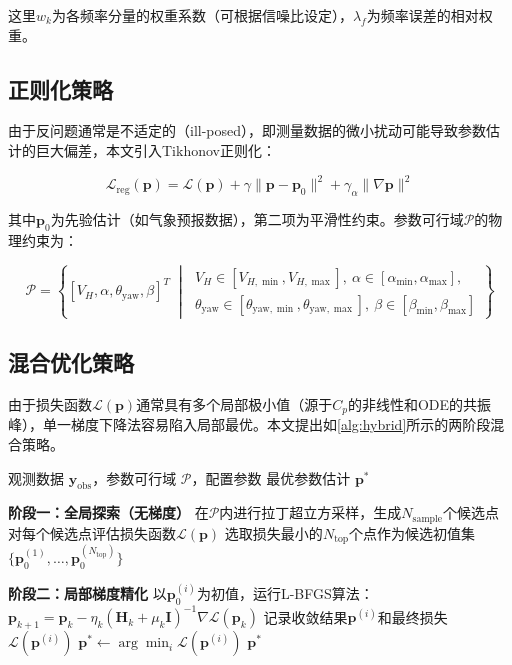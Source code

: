 \documentclass[withoutpreface,bwprint]{cumcmthesis}
\begin{document}
这里$w_k$为各频率分量的权重系数（可根据信噪比设定），$\lambda_f$为频率误差的相对权重。

\subsection{正则化策略}

由于反问题通常是不适定的（ill-posed），即测量数据的微小扰动可能导致参数估计的巨大偏差，本文引入Tikhonov正则化：

\begin{equation}
\mathcal{L}_{\mathrm{reg}}(\mathbf{p}) = \mathcal{L}(\mathbf{p}) + \gamma\|\mathbf{p}-\mathbf{p}_0\|^2 + \gamma_\alpha\|\nabla\mathbf{p}\|^2
\label{eq:reg}
\end{equation}

其中$\mathbf{p}_0$为先验估计（如气象预报数据），第二项为平滑性约束。参数可行域$\mathcal{P}$的物理约束为：

\begin{equation}
\mathcal{P} = \left\{ [V_H,\alpha,\theta_{\mathrm{yaw}},\beta]^T \;\middle|\; 
\begin{array}{l}
V_H \in [V_{H,\min}, V_{H,\max}],\ 
\alpha \in [\alpha_{\min}, \alpha_{\max}], \\
\theta_{\mathrm{yaw}} \in [\theta_{\mathrm{yaw},\min}, \theta_{\mathrm{yaw},\max}],\ 
\beta \in [\beta_{\min}, \beta_{\max}]
\end{array}
\right\}
\label{eq:domain}
\end{equation}

\subsection{混合优化策略}

由于损失函数$\mathcal{L}(\mathbf{p})$通常具有多个局部极小值（源于$C_p$的非线性和ODE的共振峰），单一梯度下降法容易陷入局部最优。本文提出如\cref{alg:hybrid}所示的两阶段混合策略。

\begin{algorithm}[!ht]
\caption{混合优化策略}
\label{alg:hybrid}
\begin{algorithmic}[1]
\REQUIRE 观测数据 $\mathbf{y}_{\mathrm{obs}}$，参数可行域 $\mathcal{P}$，配置参数
\ENSURE 最优参数估计 $\mathbf{p}^*$

\STATE \textbf{阶段一：全局探索（无梯度）}
\STATE 在$\mathcal{P}$内进行拉丁超立方采样，生成$N_{\mathrm{sample}}$个候选点
\STATE 对每个候选点评估损失函数$\mathcal{L}(\mathbf{p})$
\STATE 选取损失最小的$N_{\mathrm{top}}$个点作为候选初值集$\{\mathbf{p}_0^{(1)}, \ldots, \mathbf{p}_0^{(N_{\mathrm{top}})}\}$

\STATE \textbf{阶段二：局部梯度精化}
    \STATE 以$\mathbf{p}_0^{(i)}$为初值，运行L-BFGS算法：
    \STATE $\mathbf{p}_{k+1} = \mathbf{p}_k - \eta_k(\mathbf{H}_k + \mu_k\mathbf{I})^{-1}\nabla\mathcal{L}(\mathbf{p}_k)$
    \STATE 记录收敛结果$\mathbf{p}^{(i)}$和最终损失$\mathcal{L}(\mathbf{p}^{(i)})$
\ENDFOR
\STATE $\mathbf{p}^* \gets \arg\min_i \mathcal{L}(\mathbf{p}^{(i)})$
\RETURN $\mathbf{p}^*$
\end{algorithmic}
\end{algorithm}
\end{document}
